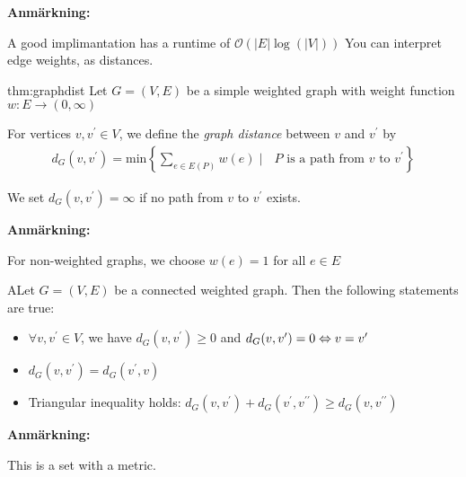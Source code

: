 \par\bigskip
\noindent\textbf{Anmärkning:}\par
\noindent A good implimantation has a runtime of $\mathcal{O}(\left|E\right|\log(\left|V\right|))$
\newpage
\noindent You can interpret edge weights, as distances.
\par\bigskip
\begin{theo}{thm:graphdist}
  Let $G = (V,E)$ be a simple weighted graph with weight function $w:E\to(0,\infty)$ 
  \par\bigskip
  \noindent For vertices $v,v^{\prime}\in V$, we define the \textit{graph distance} between $v$ and $v^{\prime}$ by
  \begin{equation*}
    \begin{gathered}
      d_G(v,v^{\prime}) = \text{min}\left\{\sum_{e\in E(P)}w(e)\;|\;\text{ $P$ is a path from $v$ to $v^{\prime}$}\right\}
    \end{gathered}
  \end{equation*}
  \par\bigskip
  \noindent We set $d_G(v,v^{\prime}) = \infty$ if no path from $v$ to $v^{\prime}$ exists.
\end{theo}
\par\bigskip
\noindent\textbf{Anmärkning:}\par
\noindent For non-weighted graphs, we choose $w(e) = 1$ for all $e\in E$
\par\bigskip
\begin{lem}
  ALet $G = (V,E)$ be a connected weighted graph. Then the following statements are true:\par
  \begin{itemize}
    \item $\forall v,v^{\prime}\in V$, we have $d_G(v,v^{\prime})\geq0$ and $d_G(v,v^{\prime}) =0 \Leftrightarrow v = v^{\prime}$
    \item $d_G(v,v^{\prime}) = d_G(v^{\prime},v)$
    \item Triangular inequality holds: $d_G(v,v^{\prime})+d_G(v^{\prime},v^{\prime\prime})\geq d_G(v,v^{\prime\prime})$
  \end{itemize}
\end{lem}
\par\bigskip
\noindent\textbf{Anmärkning:}\par
\noindent This is a set with a metric.
\par\bigskip
